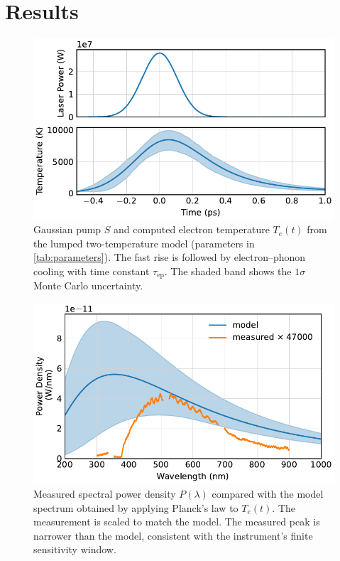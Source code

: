 \documentclass[
	parskip=half,
	a4paper,
]{scrarticle}
\begin{document}
\section{Results}
\begin{figure}
    \centering
    \includegraphics{../analysis/figures/model te.pdf}
    \caption{Gaussian pump \(S\) and computed electron temperature \(T_e(t)\) from the lumped two-temperature model (parameters in \autoref{tab:parameters}). The fast rise is followed by electron–phonon cooling with time constant \(\tau_{\mathrm{ep}}\). The shaded band shows the \(1\sigma\) Monte Carlo uncertainty.}
    \label{fig:Te}
\end{figure}
\begin{figure}
    \centering
    \includegraphics{../analysis/figures/spectrum de.pdf}
    \caption{Measured spectral power density \(P(\lambda)\) compared with the model spectrum obtained by applying Planck’s law to \(T_e(t)\). The measurement is scaled to match the model. The measured peak is narrower than the model, consistent with the instrument’s finite sensitivity window.}
    \label{fig:spectra}
\end{figure}
\end{document}
